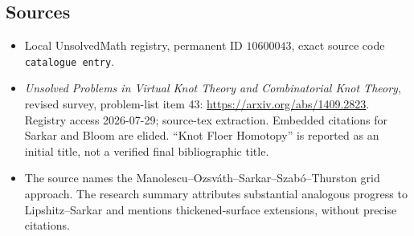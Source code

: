 \documentclass[11pt]{article}
\begin{document}
\subsection{Sources}
\begin{itemize}
\item Local UnsolvedMath registry, permanent ID \(10600043\), exact source code \texttt{catalogue entry}.
\item \emph{Unsolved Problems in Virtual Knot Theory and Combinatorial Knot Theory}, revised survey, problem-list item 43: \url{https://arxiv.org/abs/1409.2823}. Registry access 2026-07-29; source-tex extraction. Embedded citations for Sarkar and Bloom are elided. ``Knot Floer Homotopy'' is reported as an initial title, not a verified final bibliographic title.
\item The source names the Manolescu--Ozsv\'ath--Sarkar--Szab\'o--Thurston grid approach. The research summary attributes substantial analogous progress to Lipshitz--Sarkar and mentions thickened-surface extensions, without precise citations.
\end{itemize}
\end{document}
